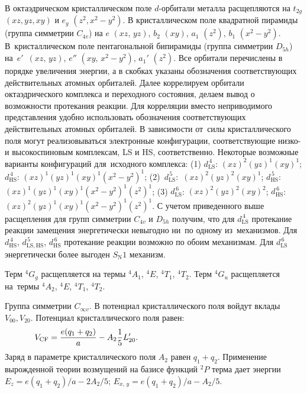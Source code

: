  В октаэдрическом кристаллическом поле $d$-орбитали металла расщепляются на $t_{2g}$ $(xz, yz, xy)$ и $e_g$ $(z^2, x^2-y^2)$. В кристаллическом поле квадратной пирамиды (группа симметрии $C_{4v}$) на $e$ $(xz,\,yz)$, $b_2$ $(xy)$, $a_1$ $(z^2)$, $b_1$ $(x^2-y^2)$. В~кристаллическом поле пентагональной бипирамиды (группа симметрии $D_{5h}$) на~$e'$~$(xz,\,yz)$, $e''$ $(xy,\,x^2-y^2)$, $a_1'$ $(z^2)$. Все орбитали перечислены в порядке увеличения энергии, а в скобках указаны обозначения соответствующих действительных атомных орбиталей. Далее коррелируем орбитали октаэдрического комплекса и переходного состояния, делаем вывод о возможности протекания реакции. Для корреляции вместо неприводимого представления удобно использовать обозначения соответствующих действительных атомных орбиталей. В зависимости от~силы кристаллического поля могут реализовываться электронные конфигурации, соответствующие низко- и высокоспиновым комплексам, LS и HS, соответственно. Некоторые возможные варианты конфигураций для~исходного комплекса: (1) $d^{\,4}_{\text{LS}}$: $(xz)^2 (yz)^1 (xy)^1$; $d^{\,4}_{\text{HS}}$: $(xz)^1 (yz)^1 (xy)^1 (x^2-y^2)^1$; (2)~$d^{\,5}_{\text{LS}}$:~$(xz)^2 (yz)^2 (xy)^1$; $d^{\,5}_{\text{HS}}$: $(xz)^1 (yz)^1 (xy)^1 (x^2-y^2)^1 (z^2)^1$; (3) $d^{\,6}_{\text{LS}}$: $(xz)^2 (yz)^2 (xy)^2$; $d^{\,6}_{\text{HS}}$:~$(xz)^2 (yz)^1 (xy)^1 (x^2-y^2)^1 (z^2)^1$. С учетом приведенного выше расщепления для групп симметрии $C_{4v}$ и $D_{5h}$ получим, что для $d^{\,4}_{\text{LS}}$ протекание реакции замещения энергетически невыгодно ни~по одному из~механизмов. Для $d^{\,4}_{\text{HS}}$, $d^{\,5}_{\text{LS},\,\text{HS}}$, $d^{\,6}_{\text{HS}}$ протекание реакции возможно по обоим механизмам. Для $d^{\,6}_{\text{LS}}$ энергетически более выгоден $S_{\text{N}}1$ механизм.\par
{} Терм $^4G_g$ расщепляется на термы $^4A_1$, $^4E$, $^4T_1$, $^4T_2$. Терм $^4G_u$ расщепляется на~термы $^4A_2$, $^4E$, $^4T_1$, $^4T_2$.\par
{} Группа симметрии $C_{\infty v}$. В потенциал кристаллического поля войдут вклады $V_{00}\text{,}\,V_{20}$. Потенциал кристаллического поля равен:
\begin{equation*}
\begin{aligned}
& V_{\text{CF}}= \dfrac{e(q_1+q_2)}{a} - A_2 \dfrac{1}{5}L_{20}'. \hspace{54mm}
\end{aligned}
\end{equation*}
Заряд в параметре кристаллического поля $A_2$ равен $q_1+q_2$. Применение вырожденной теории возмущений на базисе функций $^2P$ терма дает энергии $E_{z} = e(q_1+q_2)/a - 2A_2/5$; $E_{x,\, y} =e(q_1+q_2)/a - A_2/5$.\par
